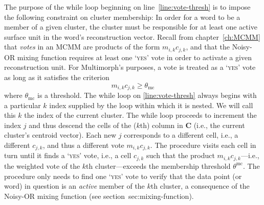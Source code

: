 The purpose of the while loop beginning on line~\ref{line:vote-thresh} is to impose the following constraint on cluster membership: In order for a word to be a member of a given cluster, the cluster must be responsible for at least one active surface unit in the word's reconstruction vector.
 Recall from chapter~\ref{ch:MCMM} that \emph{votes} in an MCMM are products of the form $m_{i,k}c_{j,k}$, and that the Noisy-OR mixing function requires at least one `\textsc{yes}' vote in order to activate a given reconstruction unit. For Multimorph's purposes, a vote is treated as a `\textsc{yes}' vote as long as it satisfies the criterion 
 \begin{equation}\label{eq:vote-criterion}
 m_{i,k}c_{j,k} \geq \theta_{\text{mc}}
 \end{equation}
 where $\theta_{\text{mc}}$ is a threshold. 
 The while loop on \ref{line:vote-thresh} always begins with a particular $k$ index supplied 
 by the loop within which it is nested. We will call this $k$ the index of the current cluster. 
 The while loop proceeds to increment the index $j$ and thus descend the cells of the ($k$th) 
 column in $\mathbf{C}$ (i.e., the current cluster's centroid vector). Each new $j$ corresponds 
 to a different cell, i.e., a different  $c_{j,k}$, and thus a different vote $m_{i,k}c_{j,k}$. 
 The procedure visits each cell in turn until it finds a `\textsc{yes}' vote, i.e., a cell $c_{j,k}$ 
 such that the product $m_{i,k}c_{j,k}$---i.e., the weighted vote of the $k$th cluster---exceeds the membership threshold $\theta^{\text{mc}}$. 
The procedure only needs to find one `\textsc{yes}' vote to verify that the data point (or word) in question is an \emph{active} member of the $k$th cluster, a consequence of the Noisy-OR mixing function (see section~{sec:mixing-function}). 

